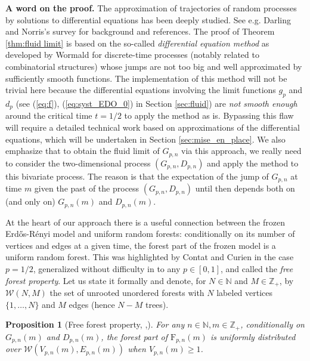 \documentclass[a4, 11pt]{article}
\numberwithin{equation}{section}
\theoremstyle{plain}
\newtheorem{proposition}[theorem]{Proposition}
\theoremstyle{definition}
\theoremstyle{remark}
\begin{document}
\textbf{A word on the proof.} The approximation of trajectories of random processes by solutions to differential equations has been deeply studied. See e.g. Darling and Norris's survey \cite{DarlingNorris08} for background and references.  The proof of Theorem \ref{thm:fluid limit} is based on the so-called \emph{differential equation method}  as developed by  Wormald \cite{wormald95,wormald97} for discrete-time processes (notably related to combinatorial structures) whose jumps are not too big and well approximated by sufficiently smooth functions. The implementation of this method will not be trivial here because the differential equations involving the limit functions $g_p$ and $d_p$ (see (\ref{eq:f}), (\ref{eq:syst_EDO_0}) in Section \ref{sec:fluid}) are \emph{not smooth enough} around the critical time $t=1/2$ to apply the method as is. Bypassing this flaw will require a detailed technical work based on approximations of the differential equations, which will be undertaken in Section \ref{sec:mise_en_place}. We also emphasize that to obtain the fluid limit of $G_{p,n}$ via this approach, we really need to consider the two-dimensional process $(G_{p,n},D_{p,n})$ and apply the method to this bivariate process. The reason is that the expectation of the jump of $G_{p,n}$ at time $m$ given the past of the process $(G_{p,n},D_{p,n})$ until then depends both on (and only on) $G_{p,n}(m)$ and $D_{p,n}(m)$. 

At the heart of our approach there is a useful connection between  the frozen Erd\H{o}s-R\'enyi model and uniform random forests: conditionally on its number of vertices and edges at a given time, the forest part of the frozen model is a uniform random forest. This was highlighted by Contat and Curien \cite{ContatCurien23} in the case $p=1/2$, generalized without difficulty in \cite{viau25} to any $p \in [0,1]$, and called the \textit{free forest property}. Let us state it formally and denote, for $N \in \mathbb N$ and $M\in \mathbb Z_+$, by $\mathcal{W}(N,M)$ the set of unrooted unordered forests with $N$ labeled vertices $\{1,\ldots,N\}$ and $M$ edges (hence $N-M$ trees). 

\begin{proposition}[Free forest property, \cite{ContatCurien23},\cite{viau25}]
\label{prop:freeforest}
	For any $n\in \mathbb N,m\in \mathbb Z_+$, conditionally on $G_{p,n}(m)$ and $D_{p,n}(m)$, the forest part of $\mathrm{F}_{p,n}(m)$ is uniformly distributed over 
	$\mathcal{W}\left(V_{p,n}(m),E_{p,n}(m) \right)$ when $V_{p,n}(m) \geq 1$.
\end{proposition}
\end{document}
